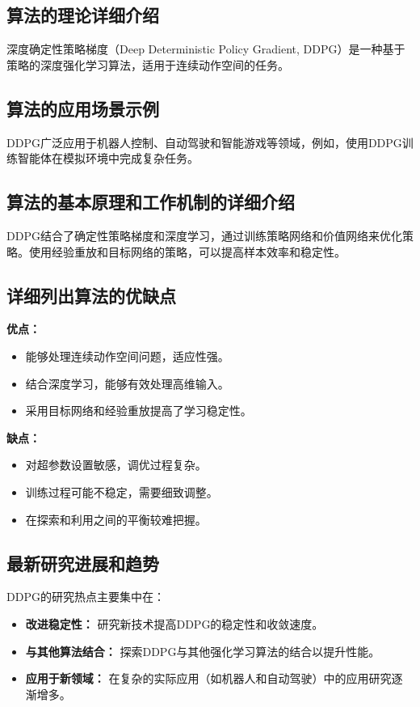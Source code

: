 \subsection*{算法的理论详细介绍}
深度确定性策略梯度（Deep Deterministic Policy Gradient, DDPG）是一种基于策略的深度强化学习算法，适用于连续动作空间的任务。

\subsection*{算法的应用场景示例}
DDPG广泛应用于机器人控制、自动驾驶和智能游戏等领域，例如，使用DDPG训练智能体在模拟环境中完成复杂任务。

\subsection*{算法的基本原理和工作机制的详细介绍}
DDPG结合了确定性策略梯度和深度学习，通过训练策略网络和价值网络来优化策略。使用经验重放和目标网络的策略，可以提高样本效率和稳定性。

\subsection*{详细列出算法的优缺点}
\textbf{优点：}
\begin{itemize}
    \item 能够处理连续动作空间问题，适应性强。
    \item 结合深度学习，能够有效处理高维输入。
    \item 采用目标网络和经验重放提高了学习稳定性。
\end{itemize}

\textbf{缺点：}
\begin{itemize}
    \item 对超参数设置敏感，调优过程复杂。
    \item 训练过程可能不稳定，需要细致调整。
    \item 在探索和利用之间的平衡较难把握。
\end{itemize}

\subsection*{最新研究进展和趋势}
DDPG的研究热点主要集中在：
\begin{itemize}
    \item \textbf{改进稳定性：} 研究新技术提高DDPG的稳定性和收敛速度。
    \item \textbf{与其他算法结合：} 探索DDPG与其他强化学习算法的结合以提升性能。
    \item \textbf{应用于新领域：} 在复杂的实际应用（如机器人和自动驾驶）中的应用研究逐渐增多。
\end{itemize}
